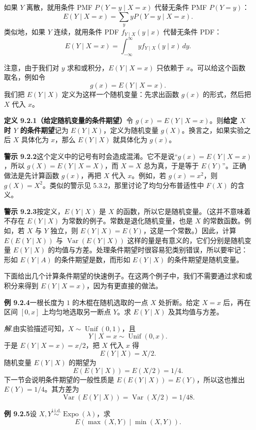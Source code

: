 \documentclass[UTF8,12pt,a4paper,fontset=fandol]{ctexart}
\begin{document}
如果 $Y$ 离散，就用条件 PMF $P(Y=y\mid X=x)$ 代替无条件 PMF $P(Y=y)$：
\[
  E(Y\mid X=x)=\sum_y yP(Y=y\mid X=x).
\]
类似地，如果 $Y$ 连续，就用条件 PDF $f_{Y\mid X}(y\mid x)$ 代替无条件 PDF：
\[
  E(Y\mid X=x)=\int_{-\infty}^{\infty} y f_{Y\mid X}(y\mid x)\,dy.
\]

注意，由于我们对 $y$ 求和或积分，$E(Y\mid X=x)$ 只依赖于 $x$。可以给这个函数取名，例如令
\[
  g(x)=E(Y\mid X=x).
\]
我们把 $E(Y\mid X)$ 定义为这样一个随机变量：先求出函数 $g(x)$ 的形式，然后把 $X$ 代入 $x$。

\noindent\textbf{定义 9.2.1（给定随机变量的条件期望）}\quad 令 $g(x)=E(Y\mid X=x)$。则\textbf{给定 $X$ 时 $Y$ 的条件期望}记为 $E(Y\mid X)$，定义为随机变量 $g(X)$。换言之，如果实验之后 $X$ 具体化为 $x$，那么 $E(Y\mid X)$ 就具体化为 $g(x)$。

\noindent\textbf{警示 9.2.2}\quad 这个定义中的记号有时会造成混淆。它不是说“$g(x)=E(Y\mid X=x)$，所以 $g(X)=E(Y\mid X=X)$，而 $X=X$ 总为真，于是等于 $E(Y)$”。正确做法是先计算函数 $g(x)$，再把 $X$ 代入 $x$。例如，若 $g(x)=x^2$，则 $g(X)=X^2$。类似的警示见 5.3.2，那里讨论了均匀分布普适性中 $F(X)$ 的含义。

\noindent\textbf{警示 9.2.3}\quad 按定义，$E(Y\mid X)$ 是 $X$ 的函数，所以它是随机变量。（这并不意味着不存在 $E(Y\mid X)$ 为常数的例子。常数是退化随机变量，也是 $X$ 的常数函数。例如，若 $X$ 与 $Y$ 独立，则 $E(Y\mid X)=E(Y)$，这是一个常数。）因此，计算 $E(E(Y\mid X))$ 与 $\operatorname{Var}(E(Y\mid X))$ 这样的量是有意义的，它们分别是随机变量 $E(Y\mid X)$ 的均值与方差。处理条件期望时很容易犯类别错误，所以要牢记：形如 $E(Y\mid A)$ 的条件期望是数，而形如 $E(Y\mid X)$ 的条件期望是随机变量。

下面给出几个计算条件期望的快速例子。在这两个例子中，我们不需要通过求和或积分来得到 $E(Y\mid X=x)$，因为有更直接的做法。

\noindent\textbf{例 9.2.4}\quad 一根长度为 $1$ 的木棍在随机选取的一点 $X$ 处折断。给定 $X=x$ 后，再在区间 $[0,x]$ 上均匀地选取另一断点 $Y$。求 $E(Y\mid X)$ 及其均值与方差。

\noindent\textit{解.}\quad 由实验描述可知，$X\sim\operatorname{Unif}(0,1)$，且
\[
  Y\mid X=x\sim\operatorname{Unif}(0,x).
\]
于是 $E(Y\mid X=x)=x/2$，把 $X$ 代入 $x$ 得
\[
  E(Y\mid X)=X/2.
\]
随机变量 $E(Y\mid X)$ 的期望为
\[
  E(E(Y\mid X))=E(X/2)=1/4.
\]
下一节会说明条件期望的一般性质是 $E(E(Y\mid X))=E(Y)$，所以这也推出 $E(Y)=1/4$。其方差为
\[
  \operatorname{Var}(E(Y\mid X))=\operatorname{Var}(X/2)=1/48.
\]

\noindent\textbf{例 9.2.5}\quad 设 $X,Y\stackrel{\text{i.i.d.}}{\sim}\operatorname{Expo}(\lambda)$，求
\[
  E(\max(X,Y)\mid \min(X,Y)).
\]
\end{document}
